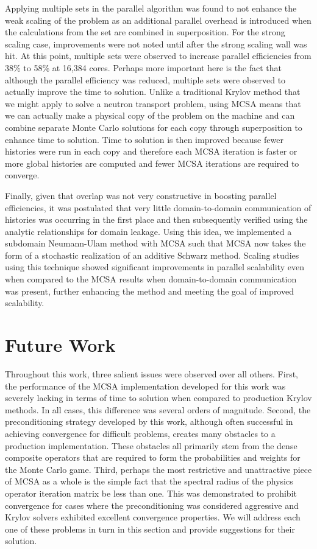 Applying multiple sets in the parallel algorithm was found to not
enhance the weak scaling of the problem as an additional parallel
overhead is introduced when the calculations from the set are combined
in superposition. For the strong scaling case, improvements were not
noted until after the strong scaling wall was hit. At this point,
multiple sets were observed to increase parallel efficiencies from
38\% to 58\% at 16,384 cores. Perhaps more important here is the fact
that although the parallel efficiency was reduced, multiple sets were
observed to actually improve the time to solution. Unlike a
traditional Krylov method that we might apply to solve a neutron
transport problem, using MCSA means that we can actually make a
physical copy of the problem on the machine and can combine separate
Monte Carlo solutions for each copy through superposition to enhance
time to solution. Time to solution is then improved because fewer
histories were run in each copy and therefore each MCSA iteration is
faster or more global histories are computed and fewer MCSA iterations
are required to converge.

Finally, given that overlap was not very constructive in boosting
parallel efficiencies, it was postulated that very little
domain-to-domain communication of histories was occurring in the first
place and then subsequently verified using the analytic relationships
for domain leakage. Using this idea, we implemented a subdomain
Neumann-Ulam method with MCSA such that MCSA now takes the form of a
stochastic realization of an additive Schwarz method. Scaling studies
using this technique showed significant improvements in parallel
scalability even when compared to the MCSA results when
domain-to-domain communication was present, further enhancing the
method and meeting the goal of improved scalability.

\section{Future Work\ }
\label{sec:future_work}

Throughout this work, three salient issues were observed over all
others. First, the performance of the MCSA implementation developed
for this work was severely lacking in terms of time to solution when
compared to production Krylov methods. In all cases, this difference
was several orders of magnitude. Second, the preconditioning strategy
developed by this work, although often successful in achieving
convergence for difficult problems, creates many obstacles to a
production implementation. These obstacles all primarily stem from the
dense composite operators that are required to form the probabilities
and weights for the Monte Carlo game. Third, perhaps the most
restrictive and unattractive piece of MCSA as a whole is the simple
fact that the spectral radius of the physics operator iteration matrix
be less than one. This was demonstrated to prohibit convergence for
cases where the preconditioning was considered aggressive and Krylov
solvers exhibited excellent convergence properties. We will address
each one of these problems in turn in this section and provide
suggestions for their solution.

